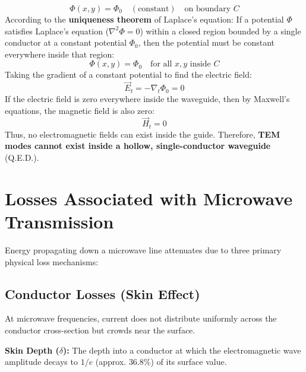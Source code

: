 \documentclass[12pt,a4paper]{article}
\begin{document}
\begin{equation}
  \Phi(x, y) = \Phi_0 \quad (\text{constant}) \quad \text{on boundary } C
\end{equation}
According to the \textbf{uniqueness theorem} of Laplace's equation:
If a potential $\Phi$ satisfies Laplace's equation ($\nabla^2 \Phi = 0$) within a closed region bounded by a single conductor at a constant potential $\Phi_0$, then the potential must be constant everywhere inside that region:
\begin{equation}
  \Phi(x, y) = \Phi_0 \quad \text{for all } x, y \text{ inside } C
\end{equation}
Taking the gradient of a constant potential to find the electric field:
\begin{equation}
  \vec{E}_t = -\nabla_t \Phi_0 = 0
\end{equation}
If the electric field is zero everywhere inside the waveguide, then by Maxwell's equations, the magnetic field is also zero:
\begin{equation}
  \vec{H}_t = 0
\end{equation}
Thus, no electromagnetic fields can exist inside the guide. Therefore, \textbf{TEM modes cannot exist inside a hollow, single-conductor waveguide} (Q.E.D.).

\section{Losses Associated with Microwave Transmission}

Energy propagating down a microwave line attenuates due to three primary physical loss mechanisms:

\subsection{Conductor Losses (Skin Effect)}
At microwave frequencies, current does not distribute uniformly across the conductor cross-section but crowds near the surface.
\begin{tcolorbox}[defbox]
\textbf{Skin Depth ($\delta$):} The depth into a conductor at which the electromagnetic wave amplitude decays to $1/e$ (approx. $36.8\%$) of its surface value.
\end{tcolorbox}
\end{document}
